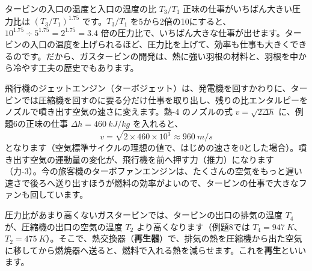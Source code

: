 \begin{phbaisuru}{タービンの入口の温度と入口の温度の比 $T_3/T_1$}
正味の仕事がいちばん大きい圧力比は $(T_3/T_1)^{1.75}$ です。$T_3/T_1$ を5から2倍の10にすると、$10^{1.75}\div5^{1.75}=2^{1.75}=3.4$ 倍の圧力比で、いちばん大きな仕事が出せます。タービンの入口の温度を上げられるほど、圧力比を上げて、効率も仕事も大きくできるのです。だから、ガスタービンの開発は、熱に強い羽根の材料と、羽根を中から冷やす工夫の歴史でもあります。
\end{phbaisuru}

\begin{motto}[4]
飛行機のジェットエンジン（ターボジェット）は、発電機を回すかわりに、タービンでは圧縮機を回すのに要る分だけ仕事を取り出し、残りの比エンタルピーをノズルで噴き出す空気の速さに変えます。熱-4 のノズルの式 $v=\sqrt{2\Delta h}$ に、例題6の正味の仕事 $\Delta h=\qty{460}{kJ/kg}$ を入れると、
\[v=\sqrt{2\times460\times10^3}\approx\qty{960}{m/s}\]
となります（空気標準サイクルの理想の値で、はじめの速さを0とした場合）。噴き出す空気の運動量の変化が、飛行機を前へ押す力（推力）になります（力-3）。今の旅客機のターボファンエンジンは、たくさんの空気をもっと遅い速さで後ろへ送り出すほうが燃料の効率がよいので、タービンの仕事で大きなファンも回しています。
\end{motto}

\label{ph:熱-7:sec7}
圧力比があまり高くないガスタービンでは、タービンの出口の排気の温度 $T_4$ が、圧縮機の出口の空気の温度 $T_2$ より高くなります（例題8では $T_4=\qty{947}{K}$、$T_2=\qty{475}{K}$）。そこで、熱交換器（\textbf{再生器}）で、排気の熱を圧縮機から出た空気に移してから燃焼器へ送ると、燃料で入れる熱を減らせます。これを\textbf{再生}といいます。

